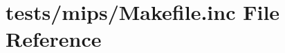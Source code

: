 \hypertarget{tests_2mips_2_makefile_8inc}{\section{tests/mips/\+Makefile.inc File Reference}
\label{tests_2mips_2_makefile_8inc}
}
